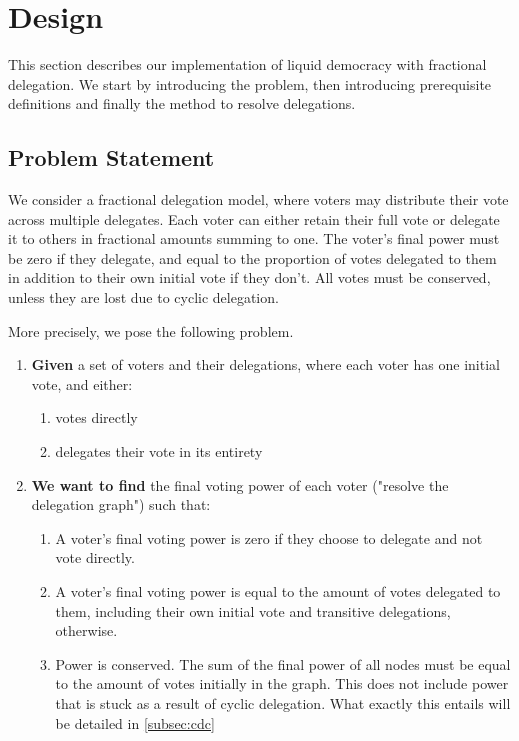 \graphicspath{ {./figures/} }

\chapter{Design}
\label{chap:design}

This section describes our implementation of liquid democracy with fractional delegation. We start by introducing the problem, then introducing prerequisite definitions and finally the method to resolve delegations. 

\section{Problem Statement}

We consider a fractional delegation model, where voters may distribute their vote across multiple  delegates. Each voter can either retain their full vote or delegate it to others in fractional amounts summing to one. The voter's final power must be zero if they delegate, and equal to the proportion of votes delegated to them in addition to their own initial vote if they don't. All votes must be conserved, unless they are lost due to cyclic delegation.

More precisely, we pose the following problem.

\begin{enumerate}
\item \textbf{Given} a set of voters and their delegations, where each voter has one initial vote, and either:
\begin{enumerate}
\item votes directly 
\item delegates their vote in its entirety
\end{enumerate}
\item \textbf{We want to find} the final voting power of each voter ("resolve the delegation graph") such that:
\begin{enumerate}
\item A voter's final voting power is zero if they choose to delegate and not vote directly.
\item A voter's final voting power is equal to the amount of votes delegated to them, including their own initial vote and transitive delegations, otherwise.
\item Power is conserved. The sum of the final power of all nodes must be equal to the amount of votes initially in the graph. This does not include power that is stuck as a result of cyclic delegation. What exactly this entails will be detailed in \cref{subsec:cdc}
\end{enumerate}
\end{enumerate}


